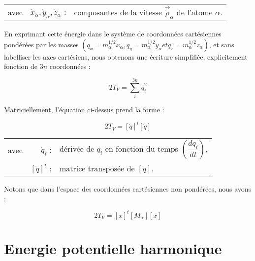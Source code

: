 \begin{flushleft}
\begin{tabular}{@{}lrp{10cm}}
avec & $\dot{x}_{\alpha}, \dot{y}_{\alpha}, \dot{z}_{\alpha}$ : & composantes de la vitesse $\stackrel{\rightarrow}{\dot{\rho}}_{\alpha}$ de l'atome $\alpha$. 
\end{tabular}
\end{flushleft}

En exprimant cette énergie dans le système de coordonnées cartésiennes pondérées par les masses $(q_x = m^{1/2}_{\alpha}x_{\alpha}, q_y = m^{1/2}_{\alpha}y_{\alpha} et q_z = m^{1/2}_{\alpha}z_{\alpha} )$, et sans labelliser les axes cartésiens, nous obtenons une écriture simplifiée, explicitement fonction de $3n$ coordonnées :

\begin{equation}
	2T_V = \sum^{3n}_i \dot{q}^2_i
\end{equation}

Matriciellement, l'équation ci-dessus prend la forme :

\begin{equation}
	2T_V = \left[\dot{q}\right]^t\left[\dot{q}\right]
\end{equation}

\begin{flushleft}
\begin{tabular}{@{}lrp{10cm}}
avec & $\dot{q}_i$ : & dérivée de $q_{i}$ en fonction du temps $\left( \dfrac{dq_i}{dt} \right)$,\\
& $\left[\dot{q}\right]^t$ : & matrice transposée de $\left[\dot{q}\right]$.
\end{tabular}
\end{flushleft}

Notons que dans l'espace des coordonnées cartésiennes non pondérées, nous avons :

\begin{equation}
	2T_V = \left[\dot{x}\right]^t \left[M_{\alpha}\right] \left[\dot{x}\right]
	\label{eq_nrj_cin_vib}
\end{equation}

\section{Energie potentielle harmonique}\label{E-harmonique}

